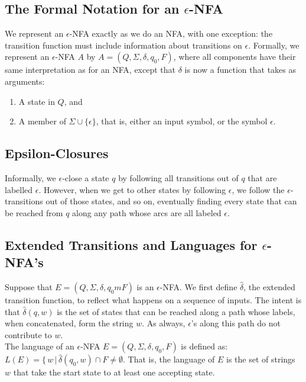 \documentclass[]{article}
\begin{document}
  \subsection*{The Formal Notation for an $\epsilon$-NFA}
    We represent an $\epsilon$-NFA exactly as we do an NFA, with one
    exception: the transition function must include information about
    transitions on $\epsilon$. Formally, we represent an $\epsilon$-NFA $A$ by
    $A = (Q, \Sigma, \delta, q_0, F)$, where all components have their same
    interpretation as for an NFA, except that $\delta$ is now a function that
    takes as arguments:
      \begin{enumerate}
        \item A state in $Q$, and
        \item A member of $\Sigma \cup \{\epsilon\}$, that is, either an input
        symbol, or the symbol $\epsilon$.
      \end{enumerate}

  \subsection*{Epsilon-Closures}
    Informally, we $\epsilon$-close a state $q$ by following all transitions
    out of $q$ that are labelled $\epsilon$. However, when we get to other
    states by following $\epsilon$, we follow the $\epsilon$-transitions out
    of those states, and so on, eventually finding every state that can be
    reached from $q$ along any path whose arcs are all labeled $\epsilon$.

  \subsection*{Extended Transitions and Languages for $\epsilon$-NFA's}
    Suppose that $E = (Q, \Sigma, \delta, q_0m F)$ is an $\epsilon$-NFA. We
    first define $\hat{\delta}$, the extended transition function, to reflect
    what happens on a sequence of inputs. The intent is that $\hat{\delta}(q,
    w)$ is the set of states that can be reached along a path whose labels,
    when concatenated, form the string $w$. As always, $\epsilon$'s along this
    path do not contribute to $w$. \\
    \indent The language of an $\epsilon$-NFA $E = (Q, \Sigma, \delta, q_0, F)
    $ is defined as: $L(E) = \{ \, w \, | \, \hat{\delta}(q_0, w) \cap F \neq
    \emptyset$. That is, the language of $E$ is the set of strings $w$ that
    take the start state to at least one accepting state.
\end{document}
